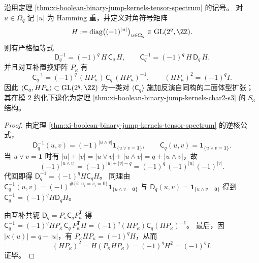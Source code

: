 \begin{proposition}\label{prop:xi-boolean-binary-jump-kernels-dihedral-inversion}
沿用定理 \ref{thm:xi-boolean-binary-jump-kernels-tensor-spectrum} 的记号。
对 \(u\in\Omega_q\) 记 \(|u|\) 为 Hamming 重，并定义对角符号矩阵
\[
H:=\mathrm{diag}\bigl((-1)^{|u|}\bigr)_{u\in\Omega_q}\in \mathrm{GL}(2^q,\ZZ).
\]
则有严格恒等式
\[
\mathsf D_q^{-1}=(-1)^q\,H\,\mathsf C_q\,H,
\qquad
\mathsf C_q^{-1}=(-1)^q\,H\,\mathsf D_q\,H.
\]
并且对互补置换矩阵 \(P_\kappa\) 有
\[
\mathsf C_q^{-1}=(-1)^q\,(H P_\kappa)\,\mathsf C_q\,(H P_\kappa)^{-1},
\qquad
(H P_\kappa)^2=(-1)^q I.
\]
因此 \(\langle \mathsf C_q,HP_\kappa\rangle\subset \mathrm{GL}(2^q,\ZZ)\) 为一类对 \(\langle \mathsf C_q\rangle\) 施加反演自同构的二面体型扩张；其在模 \(2\) 约化下退化为定理 \ref{thm:xi-boolean-binary-jump-kernels-char2-s3} 的 \(S_3\) 结构。
\end{proposition}
\begin{proof}
由定理 \ref{thm:xi-boolean-binary-jump-kernels-tensor-spectrum} 的逆核公式，
\[
\mathsf D_q^{-1}(u,v)=(-1)^{|u\wedge v|}\mathbf{1}_{\{u\vee v=\mathbf{1}\}},
\qquad
\mathsf C_q(u,v)=\mathbf{1}_{\{u\vee v=\mathbf{1}\}}.
\]
当 \(u\vee v=\mathbf 1\) 时有 \(|u|+|v|=|u\vee v|+|u\wedge v|=q+|u\wedge v|\)，故
\[
(-1)^{|u\wedge v|}
=(-1)^{|u|+|v|-q}
=(-1)^q\,(-1)^{|u|}\,(-1)^{|v|}.
\]
代回即得 \(\mathsf D_q^{-1}=(-1)^qH\mathsf C_qH\)。
同理由
\(
\mathsf C_q^{-1}(u,v)=(-1)^{\#\{i:\ u_i=v_i=0\}}\mathbf{1}_{\{u\wedge v=\mathbf{0}\}}
\)
与
\(
\mathsf D_q(u,v)=\mathbf{1}_{\{u\wedge v=\mathbf{0}\}}
\)
得到 \(\mathsf C_q^{-1}=(-1)^qH\mathsf D_qH\)。
\par
由互补共轭 \(\mathsf D_q=P_\kappa\mathsf C_qP_\kappa^{\mathsf T}\) 得
\(
\mathsf C_q^{-1}=(-1)^qH P_\kappa\,\mathsf C_q\,P_\kappa^{\mathsf T}H
=(-1)^q(HP_\kappa)\mathsf C_q(HP_\kappa)^{-1}
\)。
最后，因 \(|\kappa(u)|=q-|u|\)，有 \(P_\kappa H P_\kappa=(-1)^q H\)，从而
\[
(HP_\kappa)^2=H(P_\kappa H P_\kappa)=(-1)^qH^2=(-1)^qI.
\]
证毕。
\end{proof}

